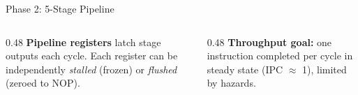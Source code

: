 \documentclass[aspectratio=169,10pt]{beamer}
\begin{document}
\begin{frame}{Phase 2: 5-Stage Pipeline}
  \vspace{0.3em}
  \begin{columns}[T]
    \begin{column}{0.48\textwidth}
      \textbf{Pipeline registers} latch stage outputs each cycle.
      Each register can be independently \textit{stalled} (frozen) or \textit{flushed} (zeroed to NOP).
    \end{column}
    \begin{column}{0.48\textwidth}
      \textbf{Throughput goal:} one instruction completed per cycle in steady state (IPC $\approx$ 1), limited by hazards.
    \end{column}
  \end{columns}
\end{frame}

\end{document}
